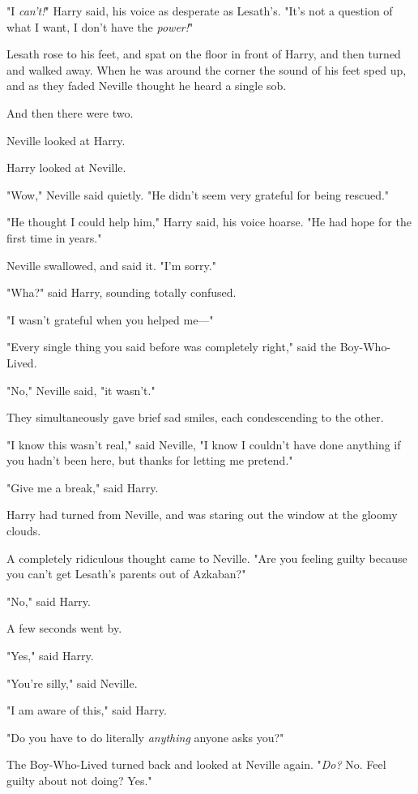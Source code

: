"I \emph{can't!}" Harry said, his voice as desperate as Lesath's. "It's not a 
question of what I want, I don't have the \emph{power!}"

Lesath rose to his feet, and spat on the floor in front of Harry, and then 
turned and walked away. When he was around the corner the sound of his feet 
sped up, and as they faded Neville thought he heard a single sob.

And then there were two.

Neville looked at Harry.

Harry looked at Neville.

"Wow," Neville said quietly. "He didn't seem very grateful for being rescued."

"He thought I could help him," Harry said, his voice hoarse. "He had hope for 
the first time in years."

Neville swallowed, and said it. "I'm sorry."

"Wha?" said Harry, sounding totally confused.

"I wasn't grateful when you helped me---"

"Every single thing you said before was completely right," said the 
Boy-Who-Lived.

"No," Neville said, "it wasn't."

They simultaneously gave brief sad smiles, each condescending to the other.

"I know this wasn't real," said Neville, "I know I couldn't have done anything 
if you hadn't been here, but thanks for letting me pretend."

"Give me a break," said Harry.

Harry had turned from Neville, and was staring out the window at the gloomy 
clouds.

A completely ridiculous thought came to Neville. "Are you feeling guilty 
because you can't get Lesath's parents out of Azkaban?"

"No," said Harry.

A few seconds went by.

"Yes," said Harry.

"You're silly," said Neville.

"I am aware of this," said Harry.

"Do you have to do literally \emph{anything} anyone asks you?"

The Boy-Who-Lived turned back and looked at Neville again. "\emph{Do?} No. Feel 
guilty about not doing? Yes."

